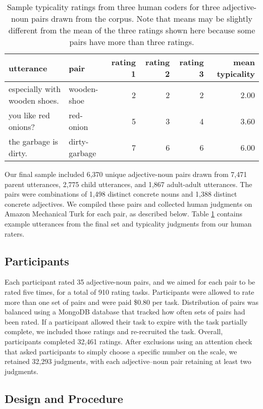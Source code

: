\documentclass{ucetd}
\begin{document}
\begin{table}[tb]
\centering
\begin{tabular}{llrrrr}
  \hline
utterance & pair & rating 1 & rating 2 & rating 3 & mean typicality \\ 
  \hline
especially with wooden shoes. & wooden-shoe &   2 &   2 &   2 & 2.00 \\ 
  you like red onions? & red-onion &   5 &   3 &   4 & 3.60 \\ 
  the garbage is dirty. & dirty-garbage &   7 &   6 &   6 & 6.00 \\ 
   \hline
\end{tabular}
\caption{Sample typicality ratings from three human coders for three adjective-noun pairs drawn from the corpus. Note that means may be slightly different from the mean of the three ratings shown here because some pairs have more than three ratings.} 
\label{tab:utt_table}
\end{table}

Our final sample included 6,370 unique adjective-noun pairs drawn from
7,471 parent utterances, 2,775 child utterances, and 1,867 adult-adult
utterances. The pairs were combinations of 1,498 distinct concrete nouns
and 1,388 distinct concrete adjectives. We compiled these pairs and
collected human judgments on Amazon Mechanical Turk for each pair, as
described below. Table \ref{tab:utt_table} contains example utterances
from the final set and typicality judgments from our human raters.

\hypertarget{participants}{%
\subsection{Participants}\label{participants}}

Each participant rated 35 adjective-noun pairs, and we aimed for each
pair to be rated five times, for a total of 910 rating tasks.
Participants were allowed to rate more than one set of pairs and were
paid \$0.80 per task. Distribution of pairs was balanced using a MongoDB
database that tracked how often sets of pairs had been rated. If a
participant allowed their task to expire with the task partially
complete, we included those ratings and re-recruited the task. Overall,
participants completed 32,461 ratings. After exclusions using an
attention check that asked participants to simply choose a specific
number on the scale, we retained 32,293 judgments, with each
adjective--noun pair retaining at least two judgments.

\hypertarget{design-and-procedure}{%
\subsection{Design and Procedure}\label{design-and-procedure}}
\end{document}
